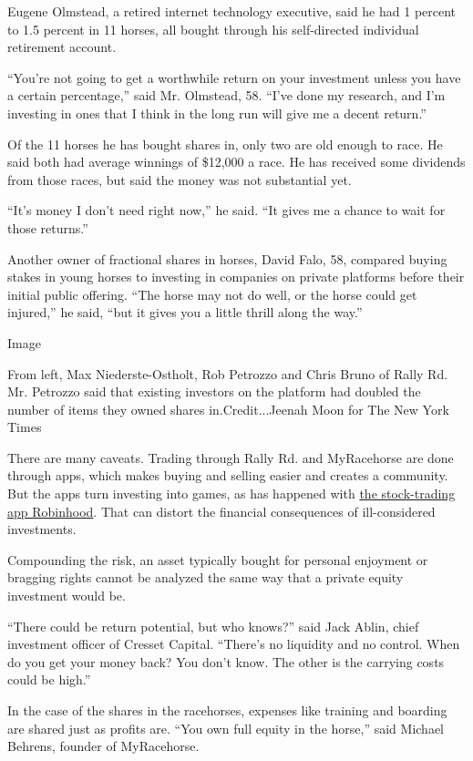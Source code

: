 Eugene Olmstead, a retired internet technology executive, said he had 1
percent to 1.5 percent in 11 horses, all bought through his
self-directed individual retirement account.

``You're not going to get a worthwhile return on your investment unless
you have a certain percentage,'' said Mr. Olmstead, 58. ``I've done my
research, and I'm investing in ones that I think in the long run will
give me a decent return.''

Of the 11 horses he has bought shares in, only two are old enough to
race. He said both had average winnings of \$12,000 a race. He has
received some dividends from those races, but said the money was not
substantial yet.

``It's money I don't need right now,'' he said. ``It gives me a chance
to wait for those returns.''

Another owner of fractional shares in horses, David Falo, 58, compared
buying stakes in young horses to investing in companies on private
platforms before their initial public offering. ``The horse may not do
well, or the horse could get injured,'' he said, ``but it gives you a
little thrill along the way.''

Image

From left, Max Niederste-Ostholt, Rob Petrozzo and Chris Bruno of Rally
Rd. Mr. Petrozzo said that existing investors on the platform had
doubled the number of items they owned shares in.Credit...Jeenah Moon
for The New York Times

There are many caveats. Trading through Rally Rd. and MyRacehorse are
done through apps, which makes buying and selling easier and creates a
community. But the apps turn investing into games, as has happened with
\href{https://www.nytimes3xbfgragh.onion/2020/07/08/technology/robinhood-risky-trading.html}{the
stock-trading app Robinhood}. That can distort the financial
consequences of ill-considered investments.

Compounding the risk, an asset typically bought for personal enjoyment
or bragging rights cannot be analyzed the same way that a private equity
investment would be.

``There could be return potential, but who knows?'' said Jack Ablin,
chief investment officer of Cresset Capital. ``There's no liquidity and
no control. When do you get your money back? You don't know. The other
is the carrying costs could be high.''

In the case of the shares in the racehorses, expenses like training and
boarding are shared just as profits are. ``You own full equity in the
horse,'' said Michael Behrens, founder of MyRacehorse.

